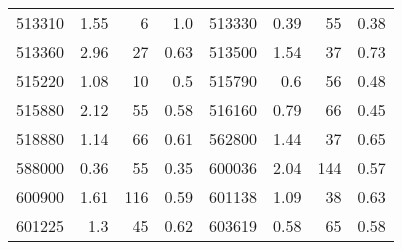 \begin{table}
\begin{tabular}{rrrrrrrr}
        513310 & 1.55 & 6    & 1.0     & 513330 & 0.39 & 55   & 0.38 \\
        513360 & 2.96 & 27   & 0.63    & 513500 & 1.54 & 37   & 0.73 \\
        515220 & 1.08 & 10   & 0.5     & 515790 & 0.6  & 56   & 0.48 \\
        515880 & 2.12 & 55   & 0.58    & 516160 & 0.79 & 66   & 0.45 \\
        518880 & 1.14 & 66   & 0.61    & 562800 & 1.44 & 37   & 0.65 \\
        588000 & 0.36 & 55   & 0.35    & 600036 & 2.04 & 144  & 0.57 \\
        600900 & 1.61 & 116  & 0.59    & 601138 & 1.09 & 38   & 0.63 \\
        601225 & 1.3  & 45   & 0.62    & 603619 & 0.58 & 65   & 0.58 \\
        \hline
    \end{tabular}
\end{table}


